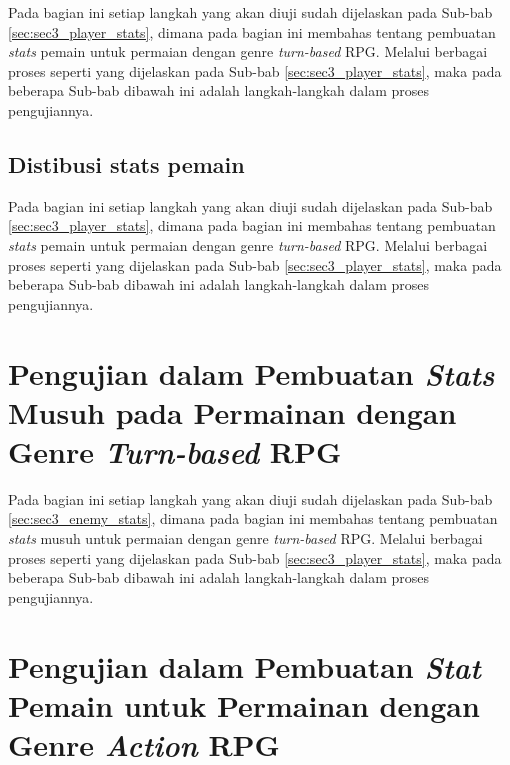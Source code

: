 Pada bagian ini setiap langkah yang akan diuji sudah dijelaskan pada Sub-bab \ref{sec:sec3_player_stats}, dimana pada bagian ini membahas tentang pembuatan \textit{stats} pemain untuk permaian dengan genre \textit{turn-based} RPG. Melalui berbagai proses seperti yang dijelaskan pada Sub-bab \ref{sec:sec3_player_stats}, maka pada beberapa Sub-bab dibawah ini adalah langkah-langkah dalam proses pengujiannya.
\vspace{1ex}

\subsection{Distibusi stats pemain}
\label{sec:sub_sec4_eval_stats}
\vspace{1ex}

Pada bagian ini setiap langkah yang akan diuji sudah dijelaskan pada Sub-bab \ref{sec:sec3_player_stats}, dimana pada bagian ini membahas tentang pembuatan \textit{stats} pemain untuk permaian dengan genre \textit{turn-based} RPG. Melalui berbagai proses seperti yang dijelaskan pada Sub-bab \ref{sec:sec3_player_stats}, maka pada beberapa Sub-bab dibawah ini adalah langkah-langkah dalam proses pengujiannya.
\vspace{1ex}

\section{Pengujian dalam Pembuatan \textit{Stats} Musuh pada Permainan dengan Genre \textit{Turn-based} RPG}
\label{sec:sec4_pengujian_turn-based_enemy}
\vspace{1ex}

Pada bagian ini setiap langkah yang akan diuji sudah dijelaskan pada Sub-bab \ref{sec:sec3_enemy_stats}, dimana pada bagian ini membahas tentang pembuatan \textit{stats} musuh untuk permaian dengan genre \textit{turn-based} RPG. Melalui berbagai proses seperti yang dijelaskan pada Sub-bab \ref{sec:sec3_player_stats}, maka pada beberapa Sub-bab dibawah ini adalah langkah-langkah dalam proses pengujiannya.
\vspace{1ex}

\section{Pengujian dalam Pembuatan \textit{Stat} Pemain untuk Permainan dengan Genre \textit{Action} RPG}
\label{sec:sec4_pengujian_player}
\vspace{1ex}


